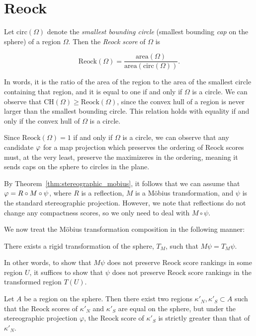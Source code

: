 \section{Reock}\label{sec:reock}

Let $\mathrm{circ}(\Omega)$ denote the \textit{smallest bounding
circle} (smallest bounding \textit{cap} on the sphere) of a region
$\Omega$.  Then the \textit{Reock score} of $\Omega$ is 

$$\mathrm{Reock}(\Omega)=
\frac{\mathrm{area}(\Omega)}{\mathrm{area}(\mathrm{circ}(\Omega))}.$$

In words, it is the ratio of the area of the region to the area of the
smallest circle containing that region, and it is equal to one if and
only if $\Omega$ is a circle.  We can observe that
$\mathrm{CH}(\Omega)\geq \mathrm{Reock}(\Omega)$, since the convex
hull of a region is never larger than the smallest bounding circle.
This relation holds with equality if and only if the convex hull of
$\Omega$ is a circle.  

Since $\mathrm{Reock}(\Omega)=1$ if and only if $\Omega$ is a circle,
we can observe that any candidate $\varphi$ for a map projection 
which preserves the ordering of Reock scores must, at the 
very least, preserve the maximizeres in the ordering, meaning 
it sends caps on the sphere to circles in the plane.  

By Theorem~\ref{thm:stereographic_mobius}, it follows that 
we can assume that $\varphi=R\circ M \circ \psi$, 
where $R$ is a reflection, $M$ is a M\"{o}bius 
transformation, and $\psi$ is the standard 
stereographic projection. However, we note that reflections do not 
change any compactness scores, so we only need 
to deal with $M\circ \psi$.

We now treat the M\"{o}bius transformation composition 
in the following manner:
\begin{claim}
  There exists a rigid transformation of the 
  sphere, $T_M$, such that $M\psi = T_M\psi$.
\end{claim}
In other words, to show that $M\psi$ 
does not preserve Reock score rankings 
in some region $U$, it suffices to show that 
$\psi$ does not preserve Reock score 
rankings in the transformed region 
$T(U)$.

\begin{theorem}\label{thm:reock}
  Let $A$ be a region on the sphere.  Then there exist two regions
  $\kappa'_N,\kappa'_S\subset A$ such that the Reock scores of
  $\kappa'_N$ and $\kappa'_S$ are equal on the sphere, but under the
  stereographic projection $\varphi$, the Reock score of $\kappa'_S$
  is strictly greater than that of $\kappa'_N$. 
\end{theorem}



